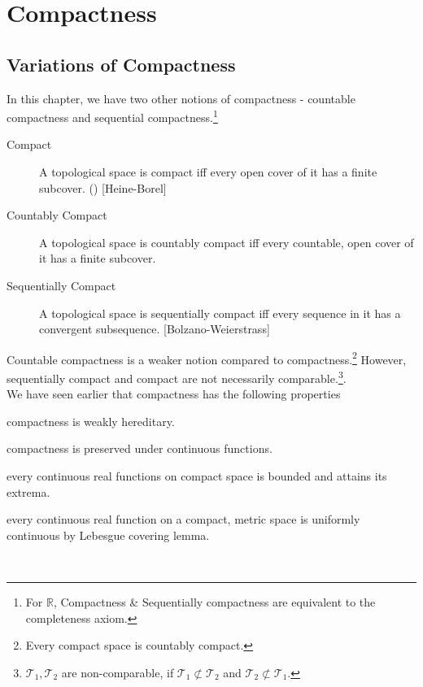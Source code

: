 \chapter{Compactness}
\section{Variations of Compactness}
	In this chapter, we have two other notions of compactness - countable compactness and sequential compactness.\footnote{For $\mathbb{R}$, Compactness \& Sequentially compactness are equivalent to the completeness axiom.}

	\begin{description}
		\item[Compact] A topological space is compact iff every open cover of it has a finite subcover. (\cite[6.1.1]{joshi}) [Heine-Borel]
		\item[Countably Compact] A topological space is countably compact iff every countable, open cover of it has a finite subcover. \cite[11.1.1]{joshi}
		\item[Sequentially Compact] A topological space is sequentially compact iff every sequence in it has a convergent subsequence. \cite[11.1.8]{joshi} [Bolzano-Weierstrass]
	\end{description}

	Countable compactness is a weaker notion compared to compactness.\footnote{Every compact space is countably compact.} However, sequentially compact and compact are not necessarily comparable.\footnote{$\mathcal{T}_1, \mathcal{T}_2$ are non-comparable, if $\mathcal{T}_1 \not\subset \mathcal{T}_2$ and $\mathcal{T}_2 \not\subset \mathcal{T}_1$.\cite[4.2.1]{joshi}}.\\

	We have seen earlier that compactness has the following properties
\begin{enumerate*}
	\item compactness is weakly hereditary.\cite[6.1.10]{joshi}
	\item compactness is preserved under continuous functions.\cite[6.1.8]{joshi}
	\item every continuous real functions on compact space is bounded and attains its extrema.\cite[6.1.6]{joshi}
	\item every continuous real function on a compact, metric space is uniformly continuous by Lebesgue covering lemma.\cite[6.1.7]{joshi}
\end{enumerate*}\\

